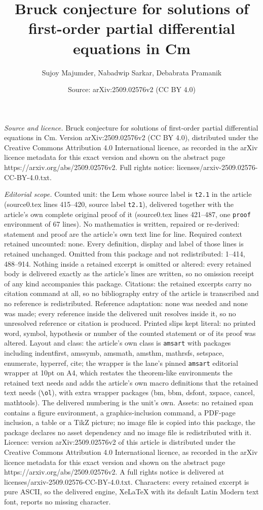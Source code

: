 \documentclass[10pt,a4paper]{amsart}
\title[Bruck conjecture for solutions of first-order partial differ]{Bruck conjecture for solutions of first-order partial differential equations in Cm}
\author{Sujoy Majumder, Nabadwip Sarkar, Debabrata Pramanik}
\date{Source: arXiv:2509.02576v2 (CC BY 4.0)}
\begin{document}
\maketitle

\noindent\emph{Source and licence.} Bruck conjecture for solutions of first-order partial differential equations in Cm. Version arXiv:2509.02576v2 (CC BY 4.0), distributed under the Creative Commons Attribution 4.0 International licence, as recorded in the arXiv licence metadata for this exact version and shown on the abstract page https://arxiv.org/abs/2509.02576v2. Full rights notice: licenses/arxiv-2509.02576-CC-BY-4.0.txt.\par\smallskip

\noindent\textit{Editorial scope.} Counted unit: the Lem whose source label is \texttt{t2.1} in the article (source0.tex lines 415--420, source label \texttt{t2.1}), delivered together with the article's own complete original proof of it (source0.tex lines 421--487, one \texttt{proof} environment of 67 lines). No mathematics is written, repaired or re-derived: statement and proof are the article's own text line for line. Required context retained uncounted: none. Every definition, display and label of those lines is retained unchanged. Omitted from this package and not redistributed: 1--414, 488--914. Nothing inside a retained excerpt is omitted or altered: every retained body is delivered exactly as the article's lines are written, so no omission receipt of any kind accompanies this package. Citations: the retained excerpts carry no citation command at all, so no bibliography entry of the article is transcribed and no reference is redistributed. Reference adaptation: none was needed and none was made; every reference inside the delivered unit resolves inside it, so no unresolved reference or citation is produced. Printed slips kept literal: no printed word, symbol, hypothesis or number of the counted statement or of its proof was altered. Layout and class: the article's own class is \texttt{amsart} with packages including indentfirst, amssymb, amsmath, amsthm, mathrsfs, setspace, enumerate, hyperref, cite; the wrapper is the lane's pinned \texttt{amsart} editorial wrapper at 10pt on A4, which restates the theorem-like environments the retained text needs and adds the article's own macro definitions that the retained text needs (\texttt{\textbackslash ol}), with extra wrapper packages (bm, bbm, dsfont, xspace, cancel, mathtools). The delivered numbering is the unit's own. Assets: no retained span contains a figure environment, a graphics-inclusion command, a PDF-page inclusion, a table or a TikZ picture; no image file is copied into this package, the package declares no asset dependency and no image file is redistributed with it. Licence: version arXiv:2509.02576v2 of this article is distributed under the Creative Commons Attribution 4.0 International licence, as recorded in the arXiv licence metadata for this exact version and shown on the abstract page https://arxiv.org/abs/2509.02576v2. A full rights notice is delivered at licenses/arxiv-2509.02576-CC-BY-4.0.txt. Characters: every retained excerpt is pure ASCII, so the delivered engine, XeLaTeX with its default Latin Modern text font, reports no missing character.
\end{document}
